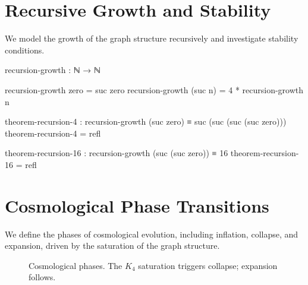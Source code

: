 \documentclass[11pt,a4paper]{book}
\begin{document}
\section{Recursive Growth and Stability}

We model the growth of the graph structure recursively and investigate stability conditions.

\begin{code}
recursion-growth : ℕ → ℕ

recursion-growth zero = suc zero
recursion-growth (suc n) = 4 * recursion-growth n

theorem-recursion-4 : recursion-growth (suc zero) ≡ suc (suc (suc (suc zero)))
theorem-recursion-4 = refl

theorem-recursion-16 : recursion-growth (suc (suc zero)) ≡ 16
theorem-recursion-16 = refl
\end{code}

\section{Cosmological Phase Transitions}

We define the phases of cosmological evolution, including inflation, collapse, and expansion, driven by the saturation of the graph structure.

\begin{figure}[h]
\centering
{}
\caption{Cosmological phases. The $K_4$ saturation triggers collapse; expansion follows.}
\label{fig:cosmological-phases}
\end{figure}
\end{document}
